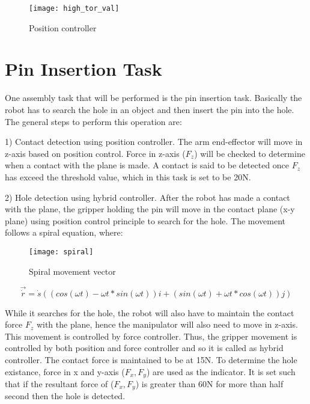 \begin{figure}[H]
    \centering
    \texttt{[image: high\_tor\_val]}
    \caption{Position controller}
    \label{fig: Position controller}
\end{figure}


\section{Pin Insertion Task}

One assembly task that will be performed is the pin insertion task. Basically the robot has to search the hole in an object and then insert the pin into the hole. The general steps to perform this operation are:

1) Contact detection using position controller. The arm end-effector will move in z-axis based on position control. Force in z-axis ($F_{z}$) will be checked to determine when a contact with the plane is made. A contact is said to be detected once $F_{z}$ has exceed the threshold value, which in this task is set to be 20N.  

2) Hole detection using hybrid controller. After the robot has made a contact with the plane, the gripper holding the pin will move in the contact plane (x-y plane) using position control principle to search for the hole. The movement follows a spiral equation, where:

\begin{figure}[H]
    \centering
    \texttt{[image: spiral]}
    \caption{Spiral movement vector}
\end{figure}

\begin{equation}
  \vec{\dot{r}} = \dot{s}\left(\left( cos\left(\omega t\right) - \omega t * sin\left(\omega t\right) \right)i + \left( sin\left(\omega t\right) + \omega t * cos\left(\omega t\right) \right)j\right)
\end{equation}

While it searches for the hole, the robot will also have to maintain the contact force $F_{z}$ with the plane, hence the manipulator will also need to move in z-axis. This movement is controlled by force controller. Thus, the gripper movement is controlled by both position and force controller and so it is called as hybrid controller. The contact force is maintained to be at 15N. To determine the hole existance, force in x and y-axis ($F_{x}, F_{y}$) are used as the indicator. It is set such that if the resultant force of ($F_{x}, F_{y}$) is greater than 60N for more than half second then the hole is detected.

